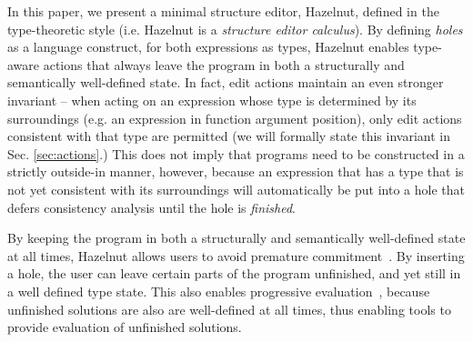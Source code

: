 

In this paper, we present a minimal structure editor, Hazelnut,  defined in the type-theoretic style (i.e. Hazelnut is a \emph{structure editor calculus}). 
By defining \emph{holes} as a language construct, for both expressions as types, Hazelnut enables type-aware actions that always leave the program in both a structurally and semantically well-defined state. 
In fact, edit actions maintain an even stronger invariant -- when acting on an expression whose type is determined by its surroundings (e.g. an expression in function argument position), only edit actions consistent with that type are permitted (we will formally state this invariant in Sec. \ref{sec:actions}.) This does not imply that programs need to be constructed in a strictly outside-in manner, however, because an expression that has a type that is not yet consistent with its surroundings will automatically be put into a {hole} that defers consistency analysis until the hole is \emph{finished}.

By keeping the program in both a structurally and semantically well-defined state at all times, Hazelnut allows users to avoid premature commitment~\cite{green1996usability}.  
By inserting a hole, the user can leave certain parts of the program unfinished,  and yet still in a well defined type state. 
This also enables progressive evaluation~\cite{green1996usability}, because unfinished solutions are also are well-defined at all times, thus enabling tools to provide evaluation of unfinished solutions.
 




